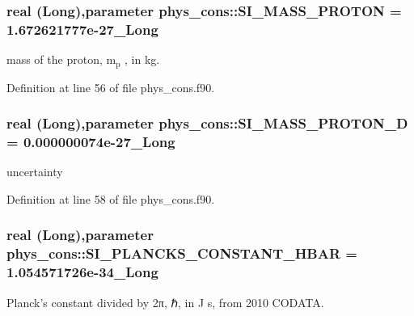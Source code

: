 \hypertarget{namespacephys__cons_a6a740864089f117512dc89ea53f3dc5f}{
\subsubsection[{SI\_\-MASS\_\-PROTON}]{\setlength{\rightskip}{0pt plus 5cm}real (Long),parameter {\bf phys\_\-cons::SI\_\-MASS\_\-PROTON} = 1.672621777e-\/27\_\-Long}}
\label{namespacephys__cons_a6a740864089f117512dc89ea53f3dc5f}


mass of the proton, m$_{\mbox{p}}$ , in kg. 



Definition at line 56 of file phys\_\-cons.f90.

\hypertarget{namespacephys__cons_a3c37a18a918519962cfc26597082d53d}{
\subsubsection[{SI\_\-MASS\_\-PROTON\_\-D}]{\setlength{\rightskip}{0pt plus 5cm}real (Long),parameter {\bf phys\_\-cons::SI\_\-MASS\_\-PROTON\_\-D} = 0.000000074e-\/27\_\-Long}}
\label{namespacephys__cons_a3c37a18a918519962cfc26597082d53d}


uncertainty 



Definition at line 58 of file phys\_\-cons.f90.

\hypertarget{namespacephys__cons_ab49e79c21c913c5857dedf2c555d2c21}{
\subsubsection[{SI\_\-PLANCKS\_\-CONSTANT\_\-HBAR}]{\setlength{\rightskip}{0pt plus 5cm}real (Long),parameter {\bf phys\_\-cons::SI\_\-PLANCKS\_\-CONSTANT\_\-HBAR} = 1.054571726e-\/34\_\-Long}}
\label{namespacephys__cons_ab49e79c21c913c5857dedf2c555d2c21}


Planck's constant divided by 2π, ℏ, in J s, from 2010 CODATA. 



